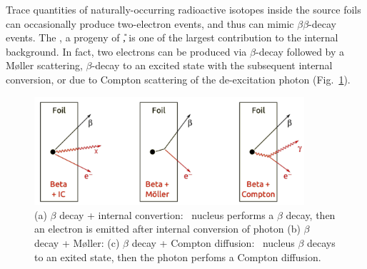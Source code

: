Trace quantities of naturally-occurring radioactive isotopes inside the source foils can occasionally produce two-electron events, and thus can mimic $\beta\beta$-decay events.
The \Tl, a progeny of \U, is one of the largest contribution to the internal background.
In fact, two electrons can be produced via $\beta$-decay followed by a M\o{}ller scattering, $\beta$-decay to an excited state with the subsequent internal conversion, or due to Compton scattering of the de-excitation photon (Fig.~\ref{fig:internal_contamination}).
\begin{figure}
  \centering
  \includegraphics[width=10cm]{timedifference/fig_timediff/internal_contamination.pdf}
  \caption{(a) $\beta$ decay + internal convertion: \Tl\ nucleus performs a $\beta$ decay, then an electron is emitted after internal conversion of photon
    (b) $\beta$ decay + M\o{}ller:
    (c) $\beta$ decay + Compton diffusion: \Tl\ nucleus $\beta$ decays to an exited state, then the photon perfoms a Compton diffusion.
 \label{fig:internal_contamination}}
\end{figure}

